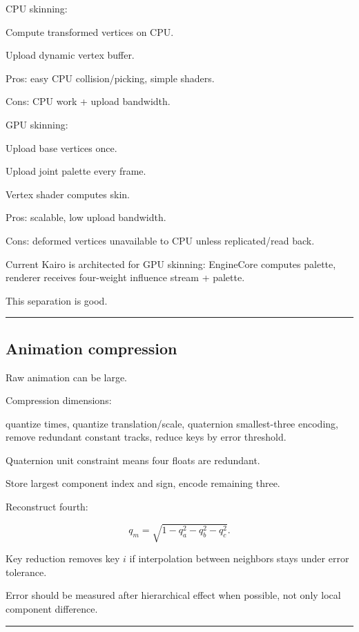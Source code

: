 CPU skinning:

Compute transformed vertices on CPU.

Upload dynamic vertex buffer.

Pros: easy CPU collision/picking, simple shaders.

Cons: CPU work + upload bandwidth.

GPU skinning:

Upload base vertices once.

Upload joint palette every frame.

Vertex shader computes skin.

Pros: scalable, low upload bandwidth.

Cons: deformed vertices unavailable to CPU unless replicated/read back.

Current Kairo is architected for GPU skinning: EngineCore computes palette, renderer receives four-weight influence stream + palette.

This separation is good.

\begin{center}\rule{0.5\linewidth}{0.5pt}\end{center}

\subsection{Animation compression}\label{04-visual-computing-ii-ch041-animation-compression}

Raw animation can be large.

Compression dimensions:

quantize times, quantize translation/scale, quaternion smallest-three encoding, remove redundant constant tracks, reduce keys by error threshold.

Quaternion unit constraint means four floats are redundant.

Store largest component index and sign, encode remaining three.

Reconstruct fourth:

\[
q_m=
\sqrt{
1-
q_a^2-
q_b^2-
q_c^2
}.
\]

Key reduction removes key \(i\) if interpolation between neighbors stays under error tolerance.

Error should be measured after hierarchical effect when possible, not only local component difference.

\begin{center}\rule{0.5\linewidth}{0.5pt}\end{center}

